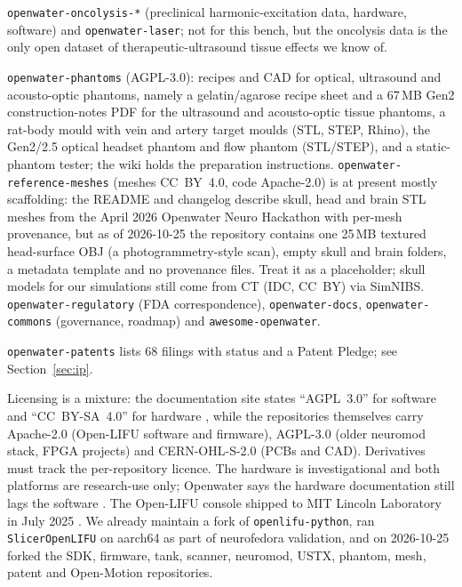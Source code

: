 \documentclass[11pt,a4paper]{article}
\begin{document}
\begin{description}[leftmargin=*,nosep]
\item[Oncolysis and laser.] \texttt{openwater-oncolysis-*} (preclinical harmonic-excitation data, hardware, software) and \texttt{openwater-laser}; not for this bench, but the oncolysis data is the only open dataset of therapeutic-ultrasound tissue effects we know of.
\item[Shared assets.] \texttt{openwater-phantoms} (AGPL-3.0): recipes and CAD for optical, ultrasound and acousto-optic phantoms, namely a gelatin/agarose recipe sheet and a 67\,MB Gen2 construction-notes PDF for the ultrasound and acousto-optic tissue phantoms, a rat-body mould with vein and artery target moulds (STL, STEP, Rhino), the Gen2/2.5 optical headset phantom and flow phantom (STL/STEP), and a static-phantom tester; the wiki holds the preparation instructions. \texttt{openwater-reference-meshes} (meshes CC~BY~4.0, code Apache-2.0) is at present mostly scaffolding: the README and changelog describe skull, head and brain STL meshes from the April 2026 Openwater Neuro Hackathon with per-mesh provenance, but as of 2026-10-25 the repository contains one 25\,MB textured head-surface OBJ (a photogrammetry-style scan), empty skull and brain folders, a metadata template and no provenance files. Treat it as a placeholder; skull models for our simulations still come from CT (IDC, CC~BY) via SimNIBS. \texttt{openwater-regulatory} (FDA correspondence), \texttt{openwater-docs}, \texttt{openwater-commons} (governance, roadmap) and \texttt{awesome-openwater}.
\item[Patents.] \texttt{openwater-patents} lists 68 filings with status and a Patent Pledge; see Section~\ref{sec:ip}.
\end{description}

Licensing is a mixture: the documentation site states ``AGPL~3.0'' for software and ``CC~BY-SA~4.0'' for hardware \cite{openwater_docs}, while the repositories themselves carry Apache-2.0 (Open-LIFU software and firmware), AGPL-3.0 (older neuromod stack, FPGA projects) and CERN-OHL-S-2.0 (PCBs and CAD). Derivatives must track the per-repository licence. The hardware is investigational and both platforms are research-use only; Openwater says the hardware documentation still lags the software \cite{openwater_open}. The Open-LIFU console shipped to MIT Lincoln Laboratory in July 2025 \cite{openlifu}. We already maintain a fork of \texttt{openlifu-python}, ran \texttt{SlicerOpenLIFU} on aarch64 as part of neurofedora validation, and on 2026-10-25 forked the SDK, firmware, tank, scanner, neuromod, USTX, phantom, mesh, patent and Open-Motion repositories.
\end{document}
